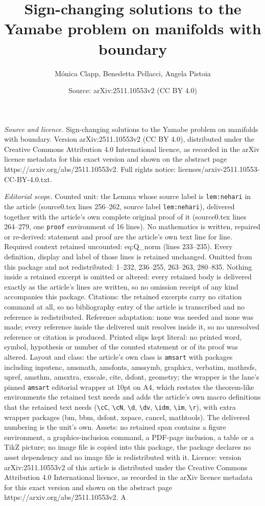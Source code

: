 \documentclass[10pt,a4paper]{amsart}
\title[Sign-changing solutions to the Yamabe problem on manifolds w]{Sign-changing solutions to the Yamabe problem on manifolds with boundary}
\author{M\'onica Clapp, Benedetta Pellacci, Angela Pistoia}
\date{Source: arXiv:2511.10553v2 (CC BY 4.0)}
\begin{document}
\maketitle

\noindent\emph{Source and licence.} Sign-changing solutions to the Yamabe problem on manifolds with boundary. Version arXiv:2511.10553v2 (CC BY 4.0), distributed under the Creative Commons Attribution 4.0 International licence, as recorded in the arXiv licence metadata for this exact version and shown on the abstract page https://arxiv.org/abs/2511.10553v2. Full rights notice: licenses/arxiv-2511.10553-CC-BY-4.0.txt.\par\smallskip

\noindent\textit{Editorial scope.} Counted unit: the Lemma whose source label is \texttt{lem:nehari} in the article (source0.tex lines 256--262, source label \texttt{lem:nehari}), delivered together with the article's own complete original proof of it (source0.tex lines 264--279, one \texttt{proof} environment of 16 lines). No mathematics is written, repaired or re-derived: statement and proof are the article's own text line for line. Required context retained uncounted: eq:Q\_norm (lines 233--235). Every definition, display and label of those lines is retained unchanged. Omitted from this package and not redistributed: 1--232, 236--255, 263--263, 280--835. Nothing inside a retained excerpt is omitted or altered: every retained body is delivered exactly as the article's lines are written, so no omission receipt of any kind accompanies this package. Citations: the retained excerpts carry no citation command at all, so no bibliography entry of the article is transcribed and no reference is redistributed. Reference adaptation: none was needed and none was made; every reference inside the delivered unit resolves inside it, so no unresolved reference or citation is produced. Printed slips kept literal: no printed word, symbol, hypothesis or number of the counted statement or of its proof was altered. Layout and class: the article's own class is \texttt{amsart} with packages including inputenc, amsmath, amsfonts, amssymb, graphicx, verbatim, mathrsfs, upref, amsthm, amsxtra, exscale, cite, dsfont, geometry; the wrapper is the lane's pinned \texttt{amsart} editorial wrapper at 10pt on A4, which restates the theorem-like environments the retained text needs and adds the article's own macro definitions that the retained text needs (\texttt{\textbackslash cC}, \texttt{\textbackslash cN}, \texttt{\textbackslash d}, \texttt{\textbackslash dv}, \texttt{\textbackslash idm}, \texttt{\textbackslash im}, \texttt{\textbackslash r}), with extra wrapper packages (bm, bbm, dsfont, xspace, cancel, mathtools). The delivered numbering is the unit's own. Assets: no retained span contains a figure environment, a graphics-inclusion command, a PDF-page inclusion, a table or a TikZ picture; no image file is copied into this package, the package declares no asset dependency and no image file is redistributed with it. Licence: version arXiv:2511.10553v2 of this article is distributed under the Creative Commons Attribution 4.0 International licence, as recorded in the arXiv licence metadata for this exact version and shown on the abstract page https://arxiv.org/abs/2511.10553v2. A 
\end{document}
